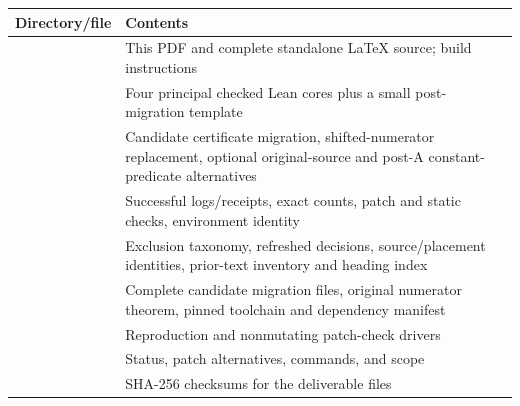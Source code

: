 \documentclass[11pt,a4paper]{article}
\begin{document}
\begin{tabularx}{\textwidth}{@{}L{39mm}Y@{}}
\toprule
Directory/file & Contents \\
\midrule
{} & This PDF and complete standalone LaTeX source; build instructions \\
 & Four principal checked Lean cores plus a small post-migration template \\
 & Candidate certificate migration, shifted-numerator replacement, optional original-source and post-A constant-predicate alternatives \\
 & Successful logs/receipts, exact counts, patch and static checks, environment identity \\
 & Exclusion taxonomy, refreshed decisions, source/placement identities, prior-text inventory and heading index \\
 & Complete candidate migration files, original numerator theorem, pinned toolchain and dependency manifest \\
 & Reproduction and nonmutating patch-check drivers \\
 & Status, patch alternatives, commands, and scope \\
 & SHA-256 checksums for the deliverable files \\
\bottomrule
\end{tabularx}
\end{document}
